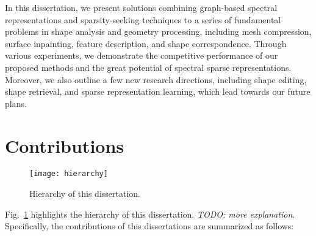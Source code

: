 In this dissertation, we present solutions combining graph-based spectral representations and
sparsity-seeking techniques to a series of fundamental problems in shape analysis and geometry
processing, including mesh compression, surface inpainting, feature description, and shape
correspondence. Through various experiments, we demonstrate the competitive performance of
our proposed methods and the great potential of spectral sparse representations. Moreover,
we also outline a few new research directions, including shape editing, shape retrieval,
and sparse representation learning, which lead towards our future plans.

\section{Contributions}

\begin{figure}
  \centering
  \texttt{[image: hierarchy]}
  \caption[Hierarchy of this dissertation]
  {Hierarchy of this dissertation.}
  \label{fig:thesis_hierarchy}
\end{figure}

Fig.~\ref{fig:thesis_hierarchy} highlights the hierarchy of this dissertation. \emph{TODO: more explanation}.\\

Specifically, the contributions of this dissertations are summarized as follows:

